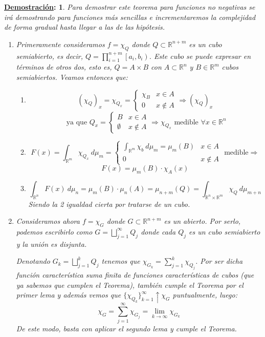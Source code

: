 \documentclass[10pt,a4paper,openright]{book}
\theoremstyle{break}
\newtheorem*{demo}{\underline{Demostración}:}
\newcommand{\dif}[1]{\ d#1}
\begin{document}
\begin{demo}
Para demostrar este teorema para funciones no negativas se irá demostrando para funciones más sencillas e incrementaremos la complejidad de forma gradual hasta llegar a las de las hipótesis.

\begin{enumerate}
\item Primeramente consideramos $f = \chi_{Q}$ donde $Q \subset \mathbb{R}^{n+m}$ es un cubo semiabierto, es decir, $Q = \prod_{i=1}^{n+m} \left[a_i, b_i\right)$. Este cubo se puede expresar en términos de otros dos, esto es, $Q = A \times B$ con $A \subset \mathbb{R}^n$ y $B \in \mathbb{R}^m$ cubos semiabiertos. Veamos entonces que:
\begin{enumerate}
    \item
    $$\left(\chi_Q\right)_x = \chi_{Q_x} = \begin{cases} \chi_B &  x \in A\\ 0 &  x \not\in A \end{cases} \Rightarrow \left(\chi_Q\right)_x$$
    $$\text{ ya que }Q_x = \begin{cases} B & x\in A \\ \emptyset & x\notin A \end{cases}\Rightarrow \chi_{Q_x} \text{ medible }\forall x \in \mathbb{R}^n$$
    \item
    $$F \left(x\right) = \int_{\mathbb{R}^m} \chi_{Q_x} \dif{\mu_m} = \begin{cases} \int_{\mathbb{R}^m} \chi_b \dif{\mu_m} = \mu_m \left(B\right) & x \in A \\ 0 & x \not\in A\end{cases} \text{ medible} \Rightarrow$$
    $$F \left(x\right) = \mu_m \left(B\right)\cdot \chi_A \left(x\right)$$
    \item
    $$\int_{\mathbb{R}^n} F \left(x\right) \dif{\mu_n} = \mu_m \left(B\right) \cdot \mu_n \left(A\right) = \mu_{n+m} \left(Q\right) = \int_{\mathbb{R}^n \times \mathbb{R}^m} \chi_Q \dif{\mu_{m+n}} $$
    Siendo la 2 igualdad cierta por tratarse de un cubo.
\end{enumerate}
\item Consideramos ahora $f = \chi_G$ donde $G \subset \mathbb{R}^{n+m}$ es un abierto. Por serlo, podemos escribirlo como $G = \bigsqcup_{j=1}^{\infty} Q_j$ donde cada $Q_j$ es un cubo semiabierto y la unión es disjunta.

Denotando $G_k = \bigsqcup_{j=1}^{k} Q_j$ tenemos que $\chi_{G_k} = \sum_{j=1}^{k} \chi_{Q_j}$. Por ser dicha función característica suma finita de funciones características de cubos (que ya sabemos que cumplen el Teorema), también cumple el Teorema por el primer lema y además vemos que $\{\chi_{Q_k}\}_{k=1}^{\infty} \uparrow \chi_G$ puntualmente, luego:
$$\chi_G = \sum_{j=1}^{\infty} \chi_{G_j} = \lim_{k \rightarrow \infty}\chi_{G_k} $$
De este modo, basta con aplicar el segundo lema y cumple el Teorema.


\end{enumerate}
\end{demo}
\end{document}

